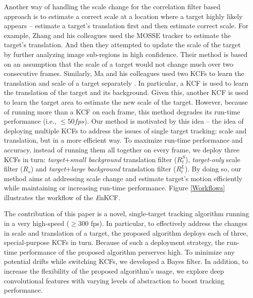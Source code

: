 \documentclass[10pt,twocolumn,letterpaper]{article}
\begin{document}
Another way of handling the scale change for the correlation filter
based approach is to estimate a correct scale at a location where a
target highly likely appears \cite{zhang2014fast} -- estimate a
target's translation first and then estimate correct scale. For
example, Zhang and his colleagues used the MOSSE tracker
\cite{bolme2010visual} to estimate the target's translation. And then
they attempted to update the scale of the target by further analyzing
image sub-regions in high confidence. Their method is based on an
assumption that the scale of a target would not change much over two
consecutive frames. Similarly, Ma and his colleagues used two KCFs to
learn the translation and scale of a target separately
\cite{ma2015long}. In particular, a KCF is used to learn the
translation of the target and its background. Given this, another KCF
is used to learn the target area to estimate the new scale of the
target. However, because of running more than a KCF on each frame,
this method degrades its run-time performance (i.e., $\leq 50
fps$). Our method is motivated by this idea -- the idea of deploying
multiple KCFs to address the issues of single target tracking: scale
and translation, but in a more efficient way. To maximize run-time
performance and accuracy, instead of running them all together on
every frame, we deploy three KCFs in turn:
\textit{target}+\textit{small background} translation filter
($R_{t}^{S}$), \textit{target-only} scale filter ($R_{s}$) and
\textit{target}+\textit{large background} translation filter
($R_{t}^{L}$). By doing so, our method aims at addressing scale
change and estimate target's motion efficiently while maintaining or
increasing run-time performance. Figure \ref{Workflows} illustrates
the workflow of the {\it E}nKCF.

The contribution of this paper is a novel, single-target tracking
algorithm running in a very high-speed ($\geq300$ fps). In particular,
to effectively address the changes in scale and translation of a
target, the proposed algorithm deploys each of three, special-purpose
KCFs in turn. Because of such a deployment strategy, the run-time
performance of the proposed algorithm perserves high. To minimize any
potential drifts while switching KCFs, we developed a Bayes filter. In
addition, to increase the flexibility of the proposed algorithm's
usage, we explore deep convolutional features with varying levels of abstraction to boost 
tracking performance.

\end{document}
